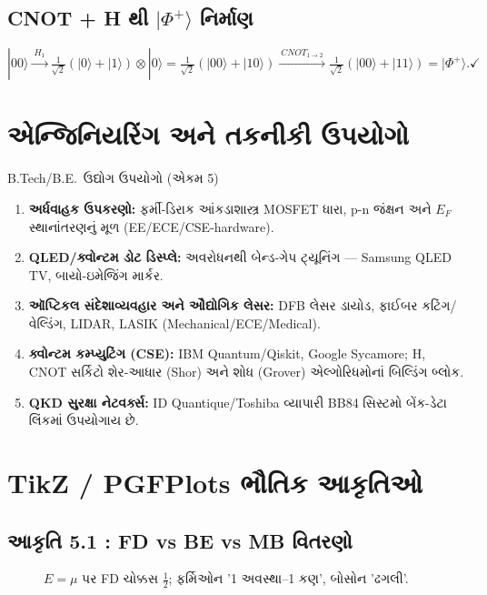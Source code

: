 \subsection{CNOT + H થી $|\Phi^{+}\rangle$ નિર્માણ}
\[
|00\rangle\xrightarrow{\ H_1\ }\tfrac{1}{\sqrt2}(|0\rangle+|1\rangle)\otimes|0\rangle
=\tfrac{1}{\sqrt2}(|00\rangle+|10\rangle)
\xrightarrow{\ CNOT_{1\to2}\ }
\tfrac{1}{\sqrt2}(|00\rangle+|11\rangle)=|\Phi^{+}\rangle . \checkmark
\]

\section{એન્જિનિયરિંગ અને તકનીકી ઉપયોગો}
\begin{upayogbox}{B.Tech/B.E.\ ઉદ્યોગ ઉપયોગો (એકમ 5)}
\begin{enumerate}[label=\textbullet]
  \item \textbf{અર્ધવાહક ઉપકરણો:} ફર્મી-ડિરાક આંકડાશાસ્ત્ર MOSFET ધારા, p-n જંક્ષન અને $E_F$ સ્થાનાંતરણનું મૂળ (EE/ECE/CSE-hardware).
  \item \textbf{QLED/ક્વોન્ટમ ડોટ ડિસ્પ્લે:} અવરોધનથી બેન્ડ-ગેપ ટ્યૂનિંગ — Samsung QLED TV, બાયો-ઇમેજિંગ માર્કર.
  \item \textbf{ઑપ્ટિકલ સંદેશાવ્યવહાર અને ઔદ્યોગિક લેસર:} DFB લેસર ડાયોડ, ફાઈબર કટિંગ/વેલ્ડિંગ, LIDAR, LASIK (Mechanical/ECE/Medical).
  \item \textbf{ક્વોન્ટમ કમ્પ્યુટિંગ (CSE):} IBM Quantum/Qiskit, Google Sycamore; H, CNOT સર્કિટો શેર-આધાર (Shor) અને શોધ (Grover) એલ્ગોરિધમોનાં બિલ્ડિંગ બ્લોક.
  \item \textbf{QKD સુરક્ષા નેટવર્ક્સ:} ID Quantique/Toshiba વ્યાપારી BB84 સિસ્ટમો બેંક-ડેટા લિંકમાં ઉપયોગાય છે.
\end{enumerate}
\end{upayogbox}

\section{TikZ / PGFPlots ભૌતિક આકૃતિઓ}

\subsection*{આકૃતિ 5.1 : FD vs BE vs MB વિતરણો}
\begin{figure}[htbp]
\centering
{}
\caption{$E=\mu$ પર FD ચોક્કસ $\tfrac12$; ફર્મિઓન '1 અવસ્થા–1 કણ', બોસોન 'ઢગલી'.}
\end{figure}


